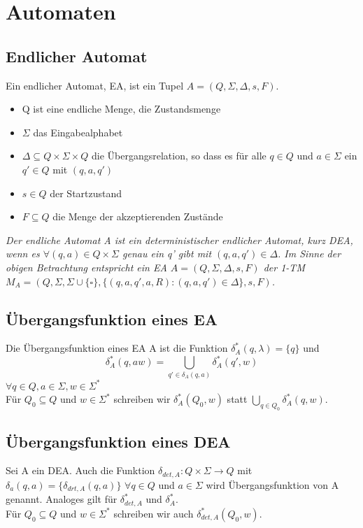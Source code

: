 \documentclass[DIV=15]{scrartcl}
\begin{document}
\section{Automaten}
    \subsection{Endlicher Automat}
        Ein endlicher Automat, EA, ist ein Tupel \(A=(Q,\Sigma,\Delta,s,F)\).
        \begin{itemize}
            \item Q ist eine endliche Menge, die Zustandsmenge 
            \item \(\Sigma\) das Eingabealphabet
            \item \(\Delta\subseteq Q\times\Sigma\times Q \) die Übergangsrelation, so dass es 
            für alle \(q\in Q\) und \(a\in\Sigma\) ein \(q'\in Q\) mit \((q,a,q')\)
            \item \(s\in Q\) der Startzustand 
            \item \(F\subseteq Q\) die Menge der akzeptierenden Zustände
        \end{itemize}
        \textit{Der endliche Automat A ist ein deterministischer endlicher Automat, kurz DEA, wenn es
        \(\forall(q,a)\in Q\times\Sigma\) genau ein q' gibt mit \((q,a,q')\in\Delta\).
        Im Sinne der obigen Betrachtung entspricht ein EA \(A=(Q,\Sigma,\Delta,s,F)\) der 1-TM
        \(M_A=(Q,\Sigma,\Sigma\cup\{\square\},\{(q,a,q',a,R):(q,a,q')\in\Delta\},s,F)\).} 
    \subsection{Übergangsfunktion eines EA}
        Die Übergangsfunktion eines EA A ist die Funktion \(\delta _A^*(q,\lambda)=\{q\}\) und
        \[\delta_A^*(q,aw)=\bigcup\limits_{q'\in\delta_A(q,a)}\delta_A^*(q',w)\] 
        \(\forall q\in Q,a\in\Sigma, w\in\Sigma^*\)\\
        Für \(Q_0\subseteq Q\) und \(w\in\Sigma^*\) schreiben wir \(\delta_A^*(Q_0,w)\) statt 
        \(\bigcup\limits_{q\in Q_0}\delta_A^*(q,w)\).
    \subsection{Übergangsfunktion eines DEA}
        Sei A ein DEA. Auch die Funktion \(\delta_{det,A}:Q\times\Sigma\to Q\) mit \(\delta_a(q,a)=\{\delta_{drt,A}(q,a)\}\)
        \(\forall q\in Q\) und \(a\in \Sigma\) wird Übergangsfunktion von A genannt.
        Analoges gilt für \(\delta_{det,A}^*\) und \(\delta_A^*\).\\
        Für \(Q_0\subseteq Q\) und \(w\in\Sigma^*\) schreiben wir auch \(\delta_{det,A}^*(Q_0,w)\).
\end{document}
